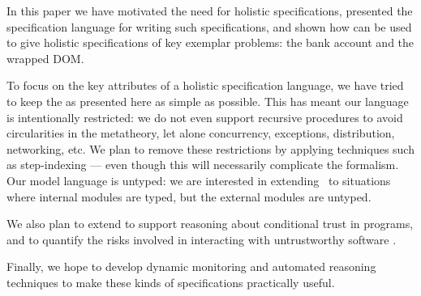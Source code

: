 In this paper we have motivated the need for holistic specifications,
presented the \Chainmail specification language for writing such
specifications, and shown how \Chainmail can be used to give holistic
specifications of key exemplar problems: the bank account and the
wrapped DOM.

To focus on the key attributes of a holistic specification language,
we have tried to keep the \Chainmail as presented here as simple as
possible. This has meant our language is intentionally restricted: we
do not even support recursive procedures to avoid circularities in the
metatheory, let alone concurrency, exceptions, distribution,
networking, etc.  We plan to remove these restrictions by applying
techniques such as step-indexing \cite{dd} --- even though this will
necessarily complicate the formalism. Our model language \LangOO is
untyped: we are interested in extending \Chainmail\ to situations
where internal modules are typed, but the external modules are untyped.

%
We also plan to extend \Chainmail to support reasoning about
conditional trust in programs, and to quantify the risks involved in
interacting with untrustworthy software \cite{swapsies}.

Finally, we hope to develop dynamic monitoring and
automated reasoning techniques to make these kinds of specifications
practically useful.
